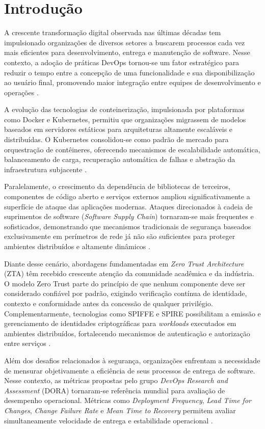 \chapter{Introdução}
\label{cap:introducao}

A crescente transformação digital observada nas últimas décadas tem impulsionado organizações de diversos setores a buscarem processos cada vez mais eficientes para desenvolvimento, entrega e manutenção de software. Nesse contexto, a adoção de práticas DevOps tornou-se um fator estratégico para reduzir o tempo entre a concepção de uma funcionalidade e sua disponibilização ao usuário final, promovendo maior integração entre equipes de desenvolvimento e operações \cite{dora2024,gitlab2024}.

A evolução das tecnologias de conteinerização, impulsionada por plataformas como Docker e Kubernetes, permitiu que organizações migrassem de modelos baseados em servidores estáticos para arquiteturas altamente escaláveis e distribuídas. O Kubernetes consolidou-se como padrão de mercado para orquestração de contêineres, oferecendo mecanismos de escalabilidade automática, balanceamento de carga, recuperação automática de falhas e abstração da infraestrutura subjacente \cite{jenkinskubernetes,spacelift2024}.

Paralelamente, o crescimento da dependência de bibliotecas de terceiros, componentes de código aberto e serviços externos ampliou significativamente a superfície de ataque das aplicações modernas. Ataques direcionados à cadeia de suprimentos de software (\textit{Software Supply Chain}) tornaram-se mais frequentes e sofisticados, demonstrando que mecanismos tradicionais de segurança baseados exclusivamente em perímetros de rede já não são suficientes para proteger ambientes distribuídos e altamente dinâmicos \cite{gama2024}.

Diante desse cenário, abordagens fundamentadas em \textit{Zero Trust Architecture} (ZTA) têm recebido crescente atenção da comunidade acadêmica e da indústria. O modelo Zero Trust parte do princípio de que nenhum componente deve ser considerado confiável por padrão, exigindo verificação contínua de identidade, contexto e conformidade antes da concessão de qualquer privilégio. Complementarmente, tecnologias como SPIFFE e SPIRE possibilitam a emissão e gerenciamento de identidades criptográficas para \textit{workloads} executados em ambientes distribuídos, fortalecendo mecanismos de autenticação e autorização entre serviços \cite{gama2024}.

Além dos desafios relacionados à segurança, organizações enfrentam a necessidade de mensurar objetivamente a eficiência de seus processos de entrega de software. Nesse contexto, as métricas propostas pelo grupo \textit{DevOps Research and Assessment} (DORA) tornaram-se referência mundial para avaliação de desempenho operacional. Métricas como \textit{Deployment Frequency}, \textit{Lead Time for Changes}, \textit{Change Failure Rate} e \textit{Mean Time to Recovery} permitem avaliar simultaneamente velocidade de entrega e estabilidade operacional \cite{dora2024,dx2024}.

